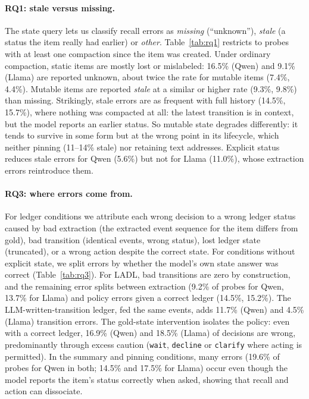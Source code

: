 \documentclass[11pt]{article}
\newcommand{\ours}{\textsc{LADL}\xspace}
\newcommand{\st}[1]{\texttt{#1}}
\begin{document}
\paragraph{RQ1: stale versus missing.} The state query lets us classify recall errors as \emph{missing} (``unknown''), \emph{stale} (a status the item really had earlier) or \emph{other}. Table~\ref{tab:rq1} restricts to probes with at least one compaction since the item was created. Under ordinary compaction, static items are mostly lost or mislabeled: 16.5\% (Qwen) and 9.1\% (Llama) are reported unknown, about twice the rate for mutable items (7.4\%, 4.4\%). Mutable items are reported \emph{stale} at a similar or higher rate (9.3\%, 9.8\%) than missing. Strikingly, stale errors are as frequent with full history (14.5\%, 15.7\%), where nothing was compacted at all: the latest transition is in context, but the model reports an earlier status. So mutable state degrades differently: it tends to survive in some form but at the wrong point in its lifecycle, which neither pinning (11--14\% stale) nor retaining text addresses. Explicit status reduces stale errors for Qwen (5.6\%) but not for Llama (11.0\%), whose extraction errors reintroduce them.

\begin{table}[t]
\centering\small\setlength{\tabcolsep}{3pt}
\resizebox{\columnwidth}{!}{}
\caption{State-recall outcome (\%) for static vs.\ mutable items, on probes with $\ge$1 compaction since the item was created. ``Stale'' is only defined for items with an earlier status.}
\label{tab:rq1}
\end{table}

\paragraph{RQ3: where errors come from.} For ledger conditions we attribute each wrong decision to a wrong ledger status caused by bad extraction (the extracted event sequence for the item differs from gold), bad transition (identical events, wrong status), lost ledger state (truncated), or a wrong action despite the correct state. For conditions without explicit state, we split errors by whether the model's own state answer was correct (Table~\ref{tab:rq3}). For \ours, bad transitions are zero by construction, and the remaining error splits between extraction (9.2\% of probes for Qwen, 13.7\% for Llama) and policy errors given a correct ledger (14.5\%, 15.2\%). The LLM-written-transition ledger, fed the same events, adds 11.7\% (Qwen) and 4.5\% (Llama) transition errors. The gold-state intervention isolates the policy: even with a correct ledger, 16.9\% (Qwen) and 18.5\% (Llama) of decisions are wrong, predominantly through excess caution (\st{wait}, \st{decline} or \st{clarify} where acting is permitted). In the summary and pinning conditions, many errors (19.6\% of probes for Qwen in both; 14.5\% and 17.5\% for Llama) occur even though the model reports the item's status correctly when asked, showing that recall and action can dissociate.
\end{document}
